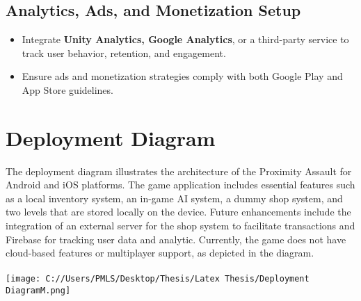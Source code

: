 	\subsection{Analytics, Ads, and Monetization Setup}
	\begin{itemize}
		\item {Integrate\textbf{ Unity Analytics, Google Analytics}, or a third-party service to track user behavior, retention, and engagement.}
		\item {Ensure ads and monetization strategies comply with both Google Play and App Store guidelines.}
	\end{itemize}

\section{Deployment Diagram}

The deployment diagram illustrates the architecture of the Proximity Assault for Android and iOS platforms. The game application includes essential features such as a local inventory system, an in-game AI system, a dummy shop system, and two levels that are stored locally on the device. Future enhancements include the integration of an external server for the shop system to facilitate transactions and Firebase for tracking user data and analytic. Currently, the game does not have cloud-based features or multiplayer support, as depicted in the diagram.\\
\\
\texttt{[image: C://Users/PMLS/Desktop/Thesis/Latex Thesis/Deployment DiagramM.png]}